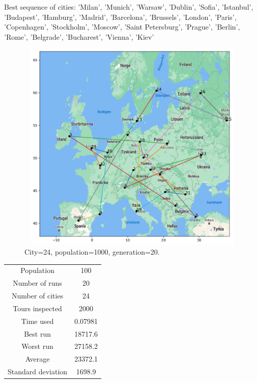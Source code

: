 \documentclass[a4paper,12pt]{article}
\begin{document}
Best sequence of cities: 'Milan', 'Munich', 'Warsaw', 'Dublin', 'Sofia', 'Istanbul', 'Budapest', 'Hamburg', 'Madrid', 'Barcelona', 'Brussels', 'London', 'Paris', 'Copenhagen', 'Stockholm', 'Moscow', 'Saint Petersburg', 'Prague', 'Berlin', 'Rome', 'Belgrade', 'Bucharest', 'Vienna', 'Kiev'\\ 

\begin{figure}[H]
\centerline{\includegraphics[width=6in, height=4in]{geneticMap4.png}}
\caption{City=24, population=1000, generation=20.}
\label{fig}
\end{figure}

\begin{center}
\begin{tabular}{ c c}
 Population & 100  \\ 
 Number of runs & 20  \\ 
 Number of cities & 24  \\  
Tours inspected & 2000  \\
 Time used & 0.07981   \\  
 Best run & 18717.6  \\ 
Worst run &27158.2  \\ 
Average & 23372.1 \\ 
 Standard deviation & 1698.9   \\ 
\end{tabular}
\end{center}
\end{document}
